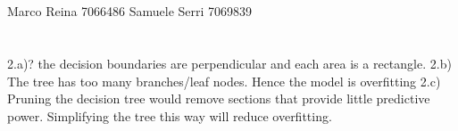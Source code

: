\documentclass[12pt]{article}
\begin{document}
\section*{}
Marco Reina 7066486 \newline
Samuele Serri 7069839 \newline
\section*{}

2.a)? the decision boundaries are perpendicular and each area is a rectangle.
2.b) The tree has too many branches/leaf nodes. Hence the model is overfitting
2.c) Pruning the decision tree would remove sections that provide little predictive power. Simplifying the tree this way will reduce overfitting.
\end{document}
